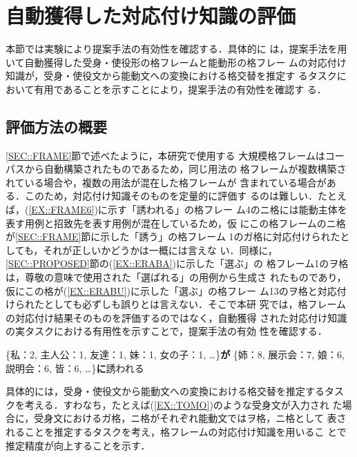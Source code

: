 \documentclass[japanese]{jnlp_1.4}
\begin{document}
 \section{自動獲得した対応付け知識の評価}
 \label{SEC::EVAL}

本節では実験により提案手法の有効性を確認する．具体的に
 は，提案手法を用いて自動獲得した受身・使役形の格フレームと能動形の格フレー
 ムの対応付け知識が，受身・使役文から能動文への変換における格交替を推定す
 るタスクにおいて有用であることを示すことにより，提案手法の有効性を確認す
 る．


  \subsection{評価方法の概要}
  \label{SEC::EVA_ABS} 

\ref{SEC::FRAME}節で述べたように，本研究で使用する
  大規模格フレームはコーパスから自動構築されたものであるため，同じ用法の
  格フレームが複数構築されている場合や，複数の用法が混在した格フレームが
  含まれている場合がある．このため，対応付け知識そのものを定量的に評価す
  るのは難しい．たとえば，(\ref{EX::FRAME6})に示す「誘われる」の格フレー
  ム4のニ格には能動主体を表す用例と招致先を表す用例が混在しているため，仮
  にこの格フレームのニ格が\ref{SEC::FRAME}節に示した「誘う」の格フレーム
  1のガ格に対応付けられたとしても，それが正しいかどうかは一概には言えな
  い．同様に，\ref{SEC::PROPOSED}節の(\ref{EX::ERABA})に示した「選ぶ」の
  格フレーム1のヲ格は，尊敬の意味で使用された「選ばれる」の用例から生成さ
  れたものであり，仮にこの格が(\ref{EX::ERABU})に示した「選ぶ」の格フレー
  ム13のヲ格と対応付けられたとしても必ずしも誤りとは言えない．そこで本研
  究では，格フレームの対応付け結果そのものを評価するのではなく，自動獲得
  された対応付け知識の実タスクにおける有用性を示すことで，提案手法の有効
  性を確認する．

\begin{exe}
	\label{EX::FRAME6}
 \sn \{私：2, 主人公：1, 友達：1, 妹：1, 女の子：1,  …\}\textbf{が}
 \sn \{姉：8, 展示会：7, 娘：6, 説明会：6, 皆：6, …\}\textbf{に}誘われる
\end{exe}

  具体的には，受身・使役文から能動文への変換における格交替を推定するタス
  クを考える．すわなち，たとえば(\ref{EX::TOMO})のような受身文が入力され
  た場合に，受身文におけるガ格，ニ格がそれぞれ能動文ではヲ格，ニ格として
  表されることを推定するタスクを考え，格フレームの対応付け知識を用いるこ
  とで推定精度が向上することを示す．
\end{document}
